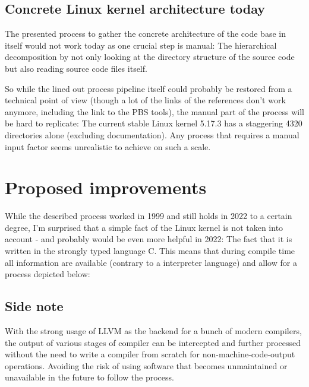 \documentclass{article}
\begin{document}
\subsection*{Concrete Linux kernel architecture today}
%

The presented process to gather the concrete architecture of the code base in itself would not work today as one crucial step is manual: The hierarchical decomposition by not only looking at the directory structure of the source code but also reading source code files itself.

So while the lined out process pipeline itself could probably be restored from a technical point of view (though a lot of the links of the references don't work anymore, including the link to the PBS tools), the manual part of the process will be hard to replicate:
The current stable Linux kernel 5.17.3 has a staggering 4320 directories alone (excluding documentation). Any process that requires a manual input factor seems unrealistic to achieve on such a scale.


\section*{Proposed improvements}

While the described process worked in 1999 and still holds in 2022 to a certain degree, I'm surprised that a simple fact of the Linux kernel
is not taken into account - and probably would be even more helpful in 2022: The fact that it is written in the 
strongly typed language C.
This means that during compile time all information are available (contrary to a interpreter language) and allow for a process depicted below:


\subsection*{Side note}
With the strong usage of LLVM as the backend for a bunch of modern compilers, the output of various stages of compiler can be intercepted and further processed without the need to write a compiler from scratch for non-machine-code-output operations.
Avoiding the risk of using software that becomes unmaintained or unavailable in the future to follow the process.
\end{document}
